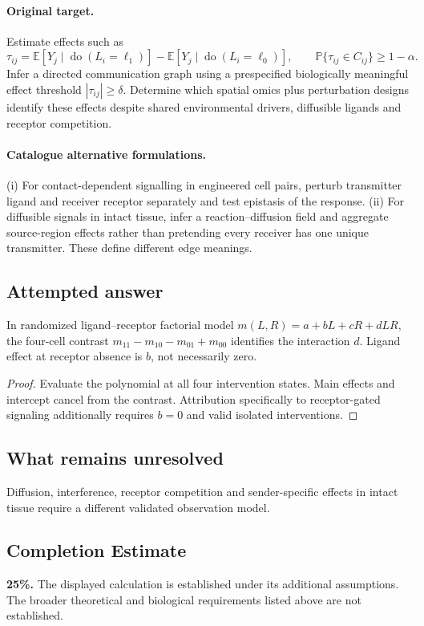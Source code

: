 \documentclass[11pt]{article}
\begin{document}
\paragraph{Original target.}
Estimate effects such as
\[\tau_{ij}=\mathbb{E}[Y_j\mid\operatorname{do}(L_i=\ell_1)]-\mathbb{E}[Y_j\mid\operatorname{do}(L_i=\ell_0)],\qquad \mathbb{P}\{\tau_{ij}\in C_{ij}\}\ge1-\alpha.\]
Infer a directed communication graph using a prespecified biologically meaningful effect threshold $|\tau_{ij}|\ge\delta$. Determine which spatial omics plus perturbation designs identify these effects despite shared environmental drivers, diffusible ligands and receptor competition.
\paragraph{Catalogue alternative formulations.}
(i) For contact-dependent signalling in engineered cell pairs, perturb transmitter ligand and receiver receptor separately and test epistasis of the response. (ii) For diffusible signals in intact tissue, infer a reaction--diffusion field and aggregate source-region effects rather than pretending every receiver has one unique transmitter. These define different edge meanings.
\subsection{Attempted answer}
\begin{proposition}
In randomized ligand--receptor factorial model $m(L,R)=a+bL+cR+dLR$, the four-cell contrast $m_{11}-m_{10}-m_{01}+m_{00}$ identifies the interaction $d$. Ligand effect at receptor absence is $b$, not necessarily zero.
\end{proposition}
\begin{proof}
Evaluate the polynomial at all four intervention states. Main effects and intercept cancel from the contrast. Attribution specifically to receptor-gated signaling additionally requires $b=0$ and valid isolated interventions.
\end{proof}
\subsection{What remains unresolved}
Diffusion, interference, receptor competition and sender-specific effects in intact tissue require a different validated observation model.
\subsection{Completion Estimate}
\textbf{25\%.} The displayed calculation is established under its additional assumptions. The broader theoretical and biological requirements listed above are not established.
\end{document}
